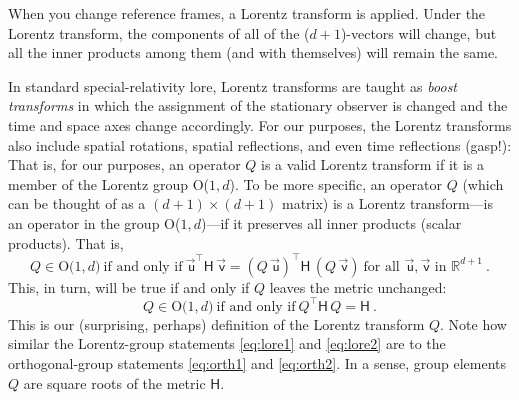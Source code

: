 \documentclass{article}
\newcommand{\metric}{\mathsf{H}}
\newcommand\upvec[1]{\!\vec{\,\mathrm{#1}}}
\newcommand{\Lvec}[1]{\upvec{\mathsf{#1}}} %
\newcommand{\plus}{\!+\!} %
\begin{document}
When you change reference frames, a Lorentz transform is applied.
Under the Lorentz transform, the components of all of the ($d\plus1$)-vectors will change, but all the inner products among them (and with themselves) will remain the same.

In standard special-relativity lore, Lorentz transforms are taught as \emph{boost transforms} in which the assignment of the stationary observer is changed and the time and space axes change accordingly.
For our purposes, the Lorentz transforms also include spatial rotations, spatial reflections, and even time reflections (gasp!):
That is, for our purposes, an operator $Q$ is a valid Lorentz transform if it is a member of the Lorentz group O($1,d$).
To be more specific, an operator $Q$ (which can be thought of as a $(d+1)\times(d+1)$ matrix) is a Lorentz transform---is an operator in the group O($1,d$)---if it preserves all inner products (scalar products). 
That is,
\begin{equation}
    Q \in \mbox{O($1,d$)} ~ \mbox{if and only if} ~ \Lvec{u}^\top\metric\,\Lvec{v}=(Q\,\Lvec{u})^\top\metric\,(Q\,\Lvec{v}) ~ \mbox{for all $\Lvec{u},\Lvec{v}$ in $\mathbb{R}^{d+1}$} ~.\label{eq:lore1}
\end{equation}
This, in turn, will be true if and only if $Q$ leaves the metric unchanged:
\begin{equation}
    Q \in \mbox{O($1,d$)} ~ \mbox{if and only if} ~ Q^\top\metric\,Q=\metric ~.\label{eq:lore2}
\end{equation}
This is our (surprising, perhaps) definition of the Lorentz transform $Q$.
Note how similar the Lorentz-group statements \eqref{eq:lore1} and \eqref{eq:lore2} are to the orthogonal-group statements \eqref{eq:orth1} and \eqref{eq:orth2}.
In a sense, group elements $Q$ are square roots of the metric $\metric$.
\end{document}

